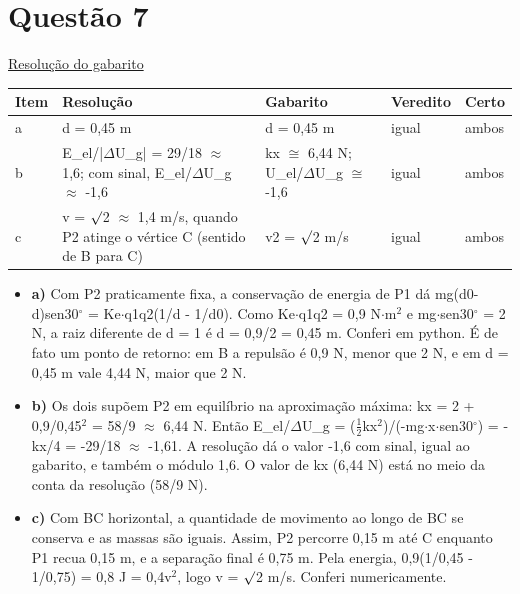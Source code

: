 \documentclass{article}%
\begin{document}
\section*{Questão 7}%
\href{https://poliedroresolve.sistemapoliedro.com.br/vestibulares/ime/2027/ime-2-fase-dia-2-27-10-2026-2-fase-dia-2/dissertativa-7-fisica-2-fase-dia-2-ime-2027}{Resolução do gabarito}\par\smallskip%
\begin{longtable}{@{}p{} p{} p{} p{} p{}@{}}\toprule Item & Resolução & Gabarito & Veredito & Certo \\ \midrule
a & d = 0,45 m & d = 0,45 m & igual & ambos \\
b & E\_el/|$\Delta$U\_g| = 29/18 $\approx$ 1,6; com sinal, E\_el/$\Delta$U\_g $\approx$ -1,6 & kx $\cong$ 6,44 N; U\_el/$\Delta$U\_g $\cong$ -1,6 & igual & ambos \\
c & v = $\surd$2 $\approx$ 1,4 m/s, quando P2 atinge o vértice C (sentido de B para C) & v2 = $\surd$2 m/s & igual & ambos \\
\bottomrule\end{longtable}%
\begin{itemize}%
\item%
\textbf{a)} Com P2 praticamente fixa, a conservação de energia de P1 dá mg(d0-d)sen30$^\circ$ = Ke$\cdot$q1q2(1/d - 1/d0). Como Ke$\cdot$q1q2 = 0,9 N$\cdot$m$^2$ e mg$\cdot$sen30$^\circ$ = 2 N, a raiz diferente de d = 1 é d = 0,9/2 = 0,45 m. Conferi em python. É de fato um ponto de retorno: em B a repulsão é 0,9 N, menor que 2 N, e em d = 0,45 m vale 4,44 N, maior que 2 N.%
\item%
\textbf{b)} Os dois supõem P2 em equilíbrio na aproximação máxima: kx = 2 + 0,9/0,45$^2$ = 58/9 $\approx$ 6,44 N. Então E\_el/$\Delta$U\_g = ($\frac12$kx$^2$)/(-mg$\cdot$x$\cdot$sen30$^\circ$) = -kx/4 = -29/18 $\approx$ -1,61. A resolução dá o valor -1,6 com sinal, igual ao gabarito, e também o módulo 1,6. O valor de kx (6,44 N) está no meio da conta da resolução (58/9 N).%
\item%
\textbf{c)} Com BC horizontal, a quantidade de movimento ao longo de BC se conserva e as massas são iguais. Assim, P2 percorre 0,15 m até C enquanto P1 recua 0,15 m, e a separação final é 0,75 m. Pela energia, 0,9(1/0,45 - 1/0,75) = 0,8 J = 0,4v$^2$, logo v = $\surd$2 m/s. Conferi numericamente.%
\end{itemize}%
\end{document}
